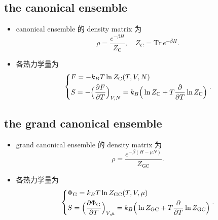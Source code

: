 \subsection{the canonical ensemble}
\begin{itemize}
	\item canonical ensemble 的 density matrix 为
	\begin{equation}
		\rho = \frac{e^{- \beta H}}{Z_\text{C}}, \quad Z_\text{C} = \mathrm{Tr} \, e^{- \beta H}.
	\end{equation}
	
	\item 各热力学量为
	\begin{equation}
		\begin{dcases}
			F = - k_B T \ln Z_\text{C}(T, V, N) \\
			S = - \Big( \frac{\partial F}{\partial T} \Big)_{V, N} = k_B \Big( \ln Z_\text{C} + T \frac{\partial}{\partial T} \ln Z_\text{C} \Big)
		\end{dcases}.
	\end{equation}
\end{itemize}

\subsection{the grand canonical ensemble}
\begin{itemize}
	\item grand canonical ensemble 的 density matrix 为
	\begin{equation}
		\rho = \frac{e^{- \beta (H - \mu N)}}{Z_\text{GC}}.
	\end{equation}
	
	\item 各热力学量为
	\begin{equation}
		\begin{dcases}
			\Phi_\text{G} = k_B T \ln Z_\text{GC}(T, V, \mu) \\
			S = \Big( \frac{\partial \Phi_\text{G}}{\partial T} \Big)_{V, \mu} = k_B \Big( \ln Z_\text{GC} + T \frac{\partial}{\partial T} \ln Z_\text{GC} \Big)
		\end{dcases}.
	\end{equation}
\end{itemize}

